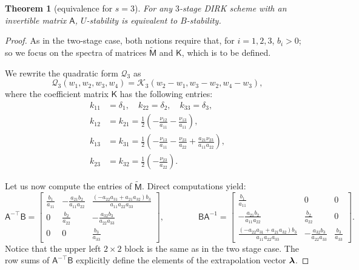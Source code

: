 \documentclass{amsart}
\newcommand{\bflambda}{\mbox{\boldmath$\lambda$}}
\newcommand{\msfA}{\mathsf{A}}
\newcommand{\msfB}{\mathsf{B}}
\newcommand{\msfM}{\mathsf{M}}
\newcommand{\msfK}{\mathsf{K}}
\newcommand{\mclK}{\mathcal{K}}
\newcommand{\mclQ}{\mathcal{Q}}
\newtheorem{theorem}{Theorem}[section]
\theoremstyle{definition}
\newcommand{\AJS}[1]{#1}
\begin{document}
\begin{theorem}[equivalence \AJS{for $s=3$}]
  For any $3$-stage DIRK scheme with an invertible matrix $\msfA$, $U$-stability is equivalent to $B$-stability.
\end{theorem}
\begin{proof}
  \AJS{As in the two-stage case, both notions require that, for $i=1,2,3$, $b_i>0$; so we focus on the spectra of matrices $\tilde{\msfM}$ and $\msfK$, which is to be defined}.
  
  We rewrite the quadratic form $\mclQ_3$ as
  \[
    \mclQ_3(w_1,w_2,w_3,w_4) = \mclK_3(w_2-w_1,w_3 - w_2, w_4 - w_3),
  \]
  where the coefficient matrix $\msfK$ has the following entries:
  \begin{align*}
    k_{11} &= \delta_1, \quad k_{22} = \delta_2, \quad k_{33} = \delta_3, \\
    k_{12} &= k_{21} = \frac{1}{2} \left( -\frac{\nu_{12}}{a_{11}} - \frac{\nu_{13}}{a_{11}} \right), \\
    k_{13} &= k_{31} = \frac{1}{2} \left( -\frac{\nu_{13}}{a_{11}} - \frac{\nu_{23}}{a_{22}} + \frac{a_{21}\nu_{23}}{a_{11}a_{22}} \right), \\
    k_{23} &= k_{32} = \frac{1}{2} \left( -\frac{\nu_{23}}{a_{22}} \right).
  \end{align*}

  Let us now compute the entries of $\tilde{\msfM}$. Direct computations yield:
  \begin{equation*}
    \msfA^{-\top}\msfB =
    \begin{bmatrix}
      \frac{b_1}{a_{11}} & -\frac{a_{21}b_2}{a_{11}a_{22}} & \frac{(-a_{22}a_{31}+a_{21}a_{32})b_3}{a_{11}a_{22}a_{33}} \\
      0 & \frac{b_2}{a_{22}} & -\frac{a_{32}b_3}{a_{22}a_{33}} \\
      0 & 0 & \frac{b_3}{a_{33}}
    \end{bmatrix},
    \qquad\qquad
    \msfB\msfA^{-1} =
    \begin{bmatrix}
      \frac{b_1}{a_{11}} & 0 & 0 \\
      -\frac{a_{21}b_2}{a_{11}a_{22}} & \frac{b_2}{a_{22}} & 0 \\
      \frac{(-a_{22}a_{31}+a_{21}a_{32})b_3}{a_{11}a_{22}a_{33}} & -\frac{a_{32}b_3}{a_{22}a_{33}} & \frac{b_3}{a_{33}}
    \end{bmatrix}.
  \end{equation*}
  Notice that the upper left $2 \times 2$ block is the same as in the two stage case. The row sums of $\msfA^{-\top}\msfB$ explicitly define the elements of the extrapolation vector $\bflambda$.


\end{proof}
\end{document}
